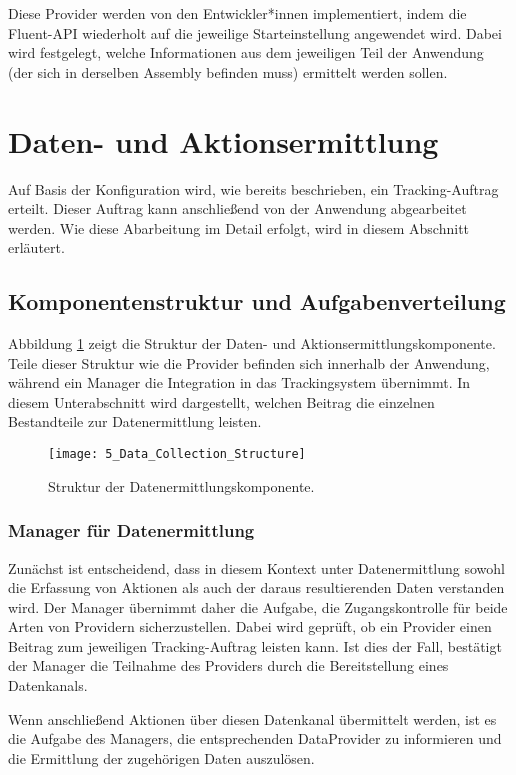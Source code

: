 Diese Provider werden von den Entwickler*innen implementiert, indem die Fluent-API wiederholt auf die jeweilige Starteinstellung angewendet wird. Dabei wird festgelegt, welche Informationen aus dem jeweiligen Teil der Anwendung (der sich in derselben Assembly befinden muss) ermittelt werden sollen.

\section{Daten- und Aktionsermittlung}
\label{sec:data_collection_concept}
Auf Basis der Konfiguration wird, wie bereits beschrieben, ein Tracking-Auftrag erteilt. Dieser Auftrag kann anschließend von der Anwendung abgearbeitet werden. Wie diese Abarbeitung im Detail erfolgt, wird in diesem Abschnitt erläutert.

\subsection{Komponentenstruktur und Aufgabenverteilung}
\label{subsec:data_collection_components}
Abbildung \ref{fig:structure_data_collection} zeigt die Struktur der Daten- und Aktionsermittlungskomponente. Teile dieser Struktur wie die Provider befinden sich innerhalb der Anwendung, während ein Manager die Integration in das Trackingsystem übernimmt. In diesem Unterabschnitt wird dargestellt, welchen Beitrag die einzelnen Bestandteile zur Datenermittlung leisten.

\begin{figure}[H]
\centering
\texttt{[image: 5\_Data\_Collection\_Structure]}
\caption{Struktur der Datenermittlungskomponente.}
\label{fig:structure_data_collection}
\end{figure}

\subsubsection{Manager für Datenermittlung}
Zunächst ist entscheidend, dass in diesem Kontext unter Datenermittlung sowohl die Erfassung von Aktionen als auch der daraus resultierenden Daten verstanden wird. Der Manager übernimmt daher die Aufgabe, die Zugangskontrolle für beide Arten von Providern sicherzustellen. Dabei wird geprüft, ob ein Provider einen Beitrag zum jeweiligen Tracking-Auftrag leisten kann. Ist dies der Fall, bestätigt der Manager die Teilnahme des Providers durch die Bereitstellung eines Datenkanals.

Wenn anschließend Aktionen über diesen Datenkanal übermittelt werden, ist es die Aufgabe des Managers, die entsprechenden DataProvider zu informieren und die Ermittlung der zugehörigen Daten auszulösen.

